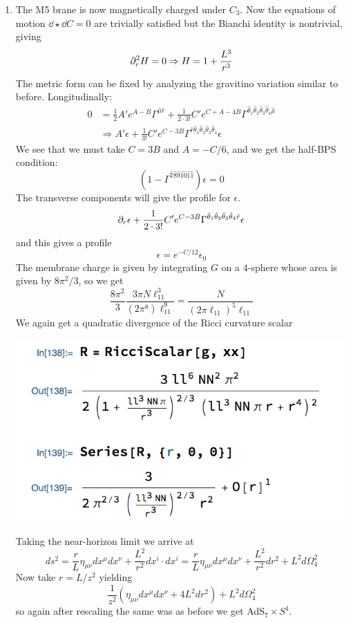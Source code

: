 \documentclass[11pt, class=article, crop=false]{standalone}
\begin{document}
\begin{enumerate}
	\item The M5 brane is now magnetically charged under $C_3$. Now the equations of motion $\dd \star \dd C = 0$ are trivially satisfied but the Bianchi identity is nontrivial, giving
	\[
		\partial^2_r H = 0 \Rightarrow H = 1 + \frac{L^3}{r^3}
	\]
	The metric form can be fixed by analyzing the gravitino variation similar to before. Longitudinally:
	\[
	\begin{aligned}
		0 &= \frac12 A' e^{A-B} \Gamma^{\hat \mu \hat r} + \frac{1}{2 \cdot 3!} C' e^{C+A-4B} \Gamma^{\hat \theta_1 \hat \theta_2 \hat \theta_3 \hat \theta_4 \hat \mu}\\
		&\Rightarrow A' \epsilon + \frac{1}{3!} C' e^{C-3B} \Gamma^{\hat r \hat \theta_1 \hat \theta_2 \hat \theta_3 \hat \theta_4 } \epsilon
	\end{aligned}
	\]
	We see that we must take $C = 3B$ and $A=-C/6$, and we get the half-BPS condition:
	\[
		(1 - \Gamma^{\hat 7 \hat 8 \hat 9 \hat{10} \hat{11}}) \epsilon = 0
	\]
	 The transverse components will give the profile for $\epsilon$.
	\[
		\partial_r \epsilon + \frac{1}{2 \cdot 3!} C' e^{C-3B} \Gamma^{\hat \theta_1 \hat \theta_2 \hat \theta_3 \hat \theta_4 \hat r}  \epsilon
	\] 
	and this gives a profile 
	\[
		\epsilon = e^{-C/12} \epsilon_0
	\]
	The membrane charge is given by integrating $G$ on a $4$-sphere whose area is given by $8\pi^2/3$, so we get
	\[
		\frac{8\pi^2}{3} \frac{3 \pi N \ell_{11}^3}{(2\pi^8) \ell_{11}^9} = \frac{N}{(2\pi \ell_{11})^5 \ell_{11}}
	\]
	We again get a quadratic divergence of the Ricci curvature scalar 
	\begin{center}
		\includegraphics[scale=0.5]{"Figures/M5 Ricci"}
	\end{center}
	Taking the near-horizon limit we arrive at
	\[
		ds^2 = \frac{r}{L}  \eta_{\mu \nu} dx^\mu dx^\nu + \frac{L^2}{r^2} dx^i \cdot dx^i = \frac{r}{L} \eta_{\mu \nu} dx^\mu dx^\nu + \frac{L^2}{r^2} dr^2 + L^2 d\Omega_4^2
	\]
	Now take $r = L/z^2$ yielding 
	\[
		\frac{1}{z^2}  (\eta_{\mu \nu} dx^\mu dx^\nu  + 4 L^2 dr^2) + L^2 d\Omega_4^2
	\]
	so again after rescaling the same was as before we get AdS$_7 \times S^4$.
	

\end{enumerate}
\end{document}
